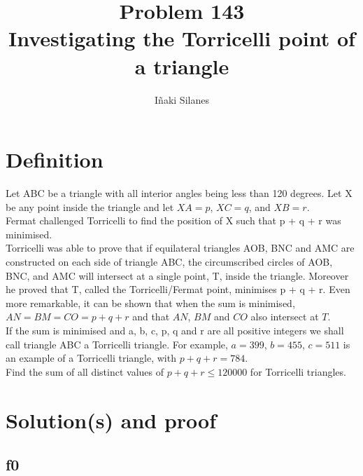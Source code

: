 \documentclass[english]{article}
\begin{document}
\newcommand{\mc}{\multicolumn}
\newcommand{\mr}{\multirow}
\newcommand{\cw}{\columnwidth}
\newcommand{\ig}[2]{\texttt{[image: \#2]}}

\title{Problem 143\\Investigating the Torricelli point of a triangle}
\author{I\~naki Silanes}
\maketitle

\section{Definition}

Let ABC be a triangle with all interior angles being less than 120 degrees. Let X be any point inside the triangle and let $XA = p$, $XC = q$, and $XB = r$.\\

Fermat challenged Torricelli to find the position of X such that p + q + r was minimised.\\

Torricelli was able to prove that if equilateral triangles AOB, BNC and AMC are constructed on each side of triangle ABC, the circumscribed circles of AOB, BNC, and AMC will intersect at a single point, T, inside the triangle. Moreover he proved that T, called the Torricelli/Fermat point, minimises p + q + r. Even more remarkable, it can be shown that when the sum is minimised, $AN = BM = CO = p + q + r$ and that $AN$, $BM$ and $CO$ also intersect at $T$.\\

If the sum is minimised and a, b, c, p, q and r are all positive integers we shall call triangle ABC a Torricelli triangle. For example, $a = 399$, $b = 455$, $c = 511$ is an example of a Torricelli triangle, with $p + q + r = 784$.\\

Find the sum of all distinct values of $p + q + r \leq 120000$ for Torricelli triangles.

\section{Solution(s) and proof}

\subsection{f0}
\end{document}

